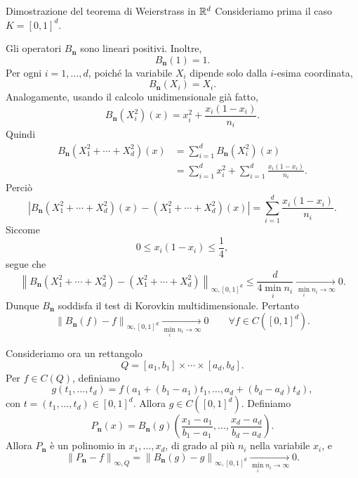 \documentclass[a4paper]{article}
\begin{document}
\begin{snippetproof}{Dimostrazione del teorema di Weierstrass in \(\mathbb{R}^d\)}
    Consideriamo prima il caso \(K=[0,1]^d\).

    Gli operatori \(B_{\mathbf n}\) sono lineari positivi. Inoltre,
    \[
        B_{\mathbf n}(1)=1.
    \]
    Per ogni \(i=1,\dots,d\), poiché la variabile \(X_i\) dipende solo dalla \(i\)-esima coordinata,
    \[
        B_{\mathbf n}(X_i)=X_i.
    \]
    Analogamente, usando il calcolo unidimensionale già fatto,
    \[
        B_{\mathbf n}(X_i^2)(x)
        =
        x_i^2+\frac{x_i(1-x_i)}{n_i}.
    \]
    Quindi
    \begin{align*}
        B_{\mathbf n}(X_1^2+\cdots+X_d^2)(x)
        &=
        \sum_{i=1}^{d}
        B_{\mathbf n}(X_i^2)(x) \\
        &=
        \sum_{i=1}^{d}
        x_i^2
        +
        \sum_{i=1}^{d}
        \frac{x_i(1-x_i)}{n_i}.
    \end{align*}
    Perciò
    \[
        \left|
        B_{\mathbf n}(X_1^2+\cdots+X_d^2)(x)
        -
        (X_1^2+\cdots+X_d^2)(x)
        \right|
        =
        \sum_{i=1}^{d}
        \frac{x_i(1-x_i)}{n_i}.
    \]
    Siccome
    \[
        0\leq x_i(1-x_i)\leq\frac14,
    \]
    segue che
    \[
        \left\|
        B_{\mathbf n}(X_1^2+\cdots+X_d^2)
        -
        (X_1^2+\cdots+X_d^2)
        \right\|_{\infty,[0,1]^d}
        \leq
        \frac{d}{4\min_i n_i}
        \xrightarrow[\min_i n_i\to\infty]{}
        0.
    \]
    Dunque \(B_{\mathbf n}\) soddisfa il test di Korovkin multidimensionale. Pertanto
    \[
        \left\|B_{\mathbf n}(f)-f\right\|_{\infty,[0,1]^d}
        \xrightarrow[\min_i n_i\to\infty]{}
        0
        \qquad
        \forall f\in C([0,1]^d).
    \]

    Consideriamo ora un rettangolo
    \[
        Q=
        [a_1,b_1]\times\cdots\times[a_d,b_d].
    \]
    Per \(f\in C(Q)\), definiamo
    \[
        g(t_1,\dots,t_d)
        =
        f\left(
            a_1+(b_1-a_1)t_1,
            \dots,
            a_d+(b_d-a_d)t_d
        \right),
    \]
    con \(t=(t_1,\dots,t_d)\in[0,1]^d\).
    Allora \(g\in C([0,1]^d)\). Definiamo
    \[
        P_{\mathbf n}(x)
        =
        B_{\mathbf n}(g)
        \left(
            \frac{x_1-a_1}{b_1-a_1},
            \dots,
            \frac{x_d-a_d}{b_d-a_d}
        \right).
    \]
    Allora \(P_{\mathbf n}\) è un polinomio in \(x_1,\dots,x_d\), di grado al più \(n_i\) nella variabile \(x_i\), e
    \[
        \left\|P_{\mathbf n}-f\right\|_{\infty,Q}
        =
        \left\|B_{\mathbf n}(g)-g\right\|_{\infty,[0,1]^d}
        \xrightarrow[\min_i n_i\to\infty]{}
        0.
    \]


\end{snippetproof}
\end{document}
